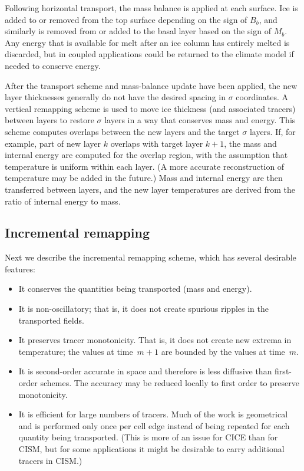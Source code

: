 Following horizontal transport, the mass balance is applied at each surface.
Ice is added to or removed from the top surface depending on the sign of $B_b$,
and similarly is removed from or added to the basal layer based on the sign of $M_b$.
Any energy that is available for melt after an ice
column has entirely melted is discarded, but in coupled applications
could be returned to the climate model if needed to conserve energy.

After the transport scheme and mass-balance update have been applied, 
the new layer thicknesses generally do not have the desired spacing in $\sigma$ coordinates.
A vertical remapping scheme is used to move ice thickness (and associated
tracers) between layers to restore $\sigma$ layers in a way that conserves mass and energy. 
This scheme computes overlaps between the new layers and the target
$\sigma$ layers.  If, for example, part of new layer $k$ overlaps with target layer $k+1$,
the mass and internal energy are computed for the overlap region, with the assumption 
that temperature is uniform within each layer.
(A more accurate reconstruction of temperature may be added in the future.) 
Mass and internal energy are then transferred between layers, and the
new layer temperatures are derived from the ratio of internal energy to mass.

\subsection{Incremental remapping}
\label{sc:incremental_remapping}

Next we describe the incremental remapping scheme, which has several desirable features:
\begin{itemize}
\item It conserves the quantities being transported (mass and energy).
\item It is non-oscillatory; that is, it does not create spurious
      ripples in the transported fields.
\item It preserves tracer monotonicity.  That is, it does not create
      new extrema in temperature; the values
      at time~$m+1$ are bounded by the values at time~$m$.
\item It is second-order accurate in space and therefore is
      less diffusive than first-order schemes.
      The accuracy may be reduced locally to first order to preserve monotonicity.
\item It is efficient for large numbers of tracers.
      Much of the work is geometrical and is performed
      only once per cell edge instead of being repeated for each
      quantity being transported.  (This is more of an issue for CICE than
      for CISM, but for some applications it might be desirable to carry
      additional tracers in CISM.)
\end{itemize}

